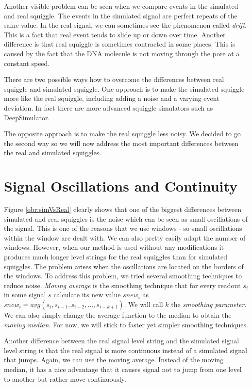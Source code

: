 Another visible problem can be seen when we compare events in the simulated and real squiggle.
The events in the simulated signal are perfect repeats of the same value. In the real signal, we can sometimes see
the phenomenon called \textit{drift}. This is a fact that real event tends to slide
up or down over time. Another difference is that real squiggle
is sometimes contracted in some places. This is caused by the fact that the DNA
molecule is not moving through the pore at a constant speed.

There are two possible ways how to overcome the differences between real squiggle
and simulated squiggle. One approach is to make the simulated squiggle more like
the real squiggle, including adding a noise and a varying event deviation. In fact there
are more advanced squiggle simulators such as DeepSimulator\cite{deepsimulator}.

The opposite approach is to make the real squiggle less noisy. We decided to go the
second way so we will now address the most important differences between the
real and simulated squiggles.

\section{Signal Oscillations and Continuity}
\label{subsection:oscillations}

Figure \ref{obr:simVsReal} clearly shows that one of the biggest differences between simulated and
real squiggles is the noise which can be seen as small oscillations of the signal. This is
one of the reasons that we use windows - so small oscillations within the window
are dealt with. We can also pretty easily adapt the number of windows.
However, when our method is used without any modifications it
produces much longer level strings for the real squiggles than for simulated squiggles.
The problem arises when the oscillations are located on the borders of the windows.
To address this problem, we tried several smoothing techniques to reduce noise. \textit{Moving average} is the
smoothing technique that for every readout $s_i$ in some signal $s$ calculate its new value
$snew_i$ as $snew_i = avg(s_{i}, s_{i-1}, s_{i-2}, \dots , s_{i-k+1})$. We will call
$k$ the \textit{smoothing parameter}. We can also simply change
the average function to the median to obtain the \textit{moving median}. For now, we will stick
to faster yet simpler smoothing techniques.

Another difference between the real signal level string
and the simulated signal level string is that the real signal is more continuous instead
of a simulated signal that jumps. Again, we can use the moving average. Instead of
the moving median, it has a nice advantage that it causes signal not to jump from
one level to another but rather move continuously.

